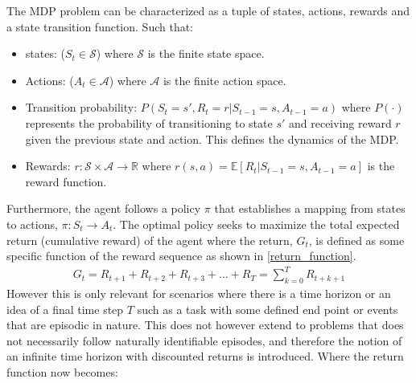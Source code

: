 The MDP problem can be characterized as a tuple of states, actions, rewards and a state transition function. Such that:

\begin{itemize}
	\item states: ($S_t\in \mathcal{S}$) where $\mathcal{S}$ is the finite state space.
	\item Actions: ($A_t \in \mathcal{A}$) where $\mathcal{A}$ is the finite action space.
	\item Transition probability: $P(S_{t} = s',R_{t} = r | S_{t-1} = s, A_{t-1} = a)$ where $P(\cdot)$ represents the probability of transitioning to state $s'$ and receiving reward $r$ given the previous state and action. This defines the dynamics of the MDP.
	\item Rewards: $r:\mathcal{S}\times \mathcal{A} \rightarrow \mathbb{R}$ where $r(s,a) = \mathbb{E}[R_{t}| S_{t-1} =s, A_{t-1} = a]$  is the reward function.
\end{itemize}


Furthermore, the agent follows a policy $\pi$ that establishes a mapping from states to actions, $\pi: S_t \rightarrow A_t$. The optimal policy seeks to maximize the total expected return (cumulative reward) of the agent where the return, $G_t$, is defined as some specific function of the reward sequence \cite{suttonReinforcementLearningIntroduction2014} as shown in \autoref{return_function}. 
\begin{equation}
	\begin{aligned}
		G_t  = R_{t+1} + R_{t+2} + R_{t+3} + \dots + R_{T} = \sum_{k=0}^TR_{t+k+1}
	\end{aligned}
	\label{return_function}
\end{equation}
However this is only relevant for scenarios where there is a time horizon or an idea of a final time step $T$ such as a task with some defined end point or events that are episodic in nature. This does not however extend to problems that does not necessarily follow naturally identifiable episodes, and therefore the notion of an infinite time horizon with discounted returns is introduced. Where the return function now becomes:

